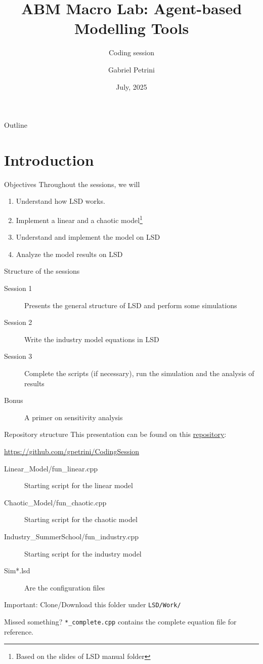 \documentclass[bigger,aspectratio=169]{beamer}
\author{Gabriel Petrini}
\date{July, 2025}
\title{ABM Macro Lab: Agent-based Modelling Tools}
\subtitle{Coding session}
\begin{document}
\maketitle
\begin{frame}{Outline}
\tableofcontents
\end{frame}

\section{Introduction}
\label{sec:org2b5df3f}

\begin{frame}[label={sec:org8122fef}]{Objectives}
Throughout the sessions, we will

\begin{enumerate}
\item Understand how LSD works.
\item Implement a linear and a chaotic model\footnote{Based on the slides of LSD manual folder}
\item Understand and implement the \textcite{dosi_2017_footprint} model on LSD
\item Analyze the model results on LSD
\end{enumerate}
\end{frame}
\begin{frame}[label={sec:org24b79d5}]{Structure of the sessions}
\begin{description}
\item[{Session 1}] Presents the general structure of LSD and perform some simulations
\item[{Session 2}] Write the industry model equations in LSD
\item[{Session 3}] Complete the scripts (if necessary), run the simulation and the analysis of results
\item[{Bonus}] A primer on sensitivity analysis
\end{description}
\end{frame}
\begin{frame}[label={sec:org9a1305b},fragile]{Repository structure}
 This presentation can be found on this \href{https://github.com/gpetrini/CodingSession}{repository}:

\url{https://github.com/gpetrini/CodingSession}

\begin{description}
\item[{Linear\_Model/fun\_linear.cpp}] Starting script for the linear model
\item[{Chaotic\_Model/fun\_chaotic.cpp}] Starting script for the chaotic model
\item[{Industry\_SummerSchool/fun\_industry.cpp}] Starting script for the industry model
\item[{Sim*.lsd}] Are the configuration files
\end{description}

\alert{Important:} Clone/Download this folder under \texttt{LSD/Work/}
\begin{block}{Missed something?}
\texttt{*\_complete.cpp} contains the complete equation file for reference.
\end{block}
\end{frame}
\end{document}
